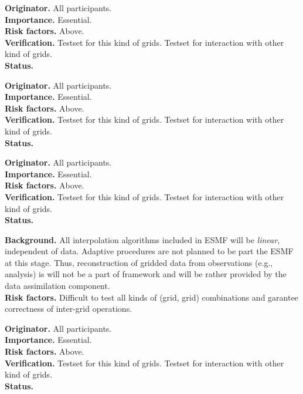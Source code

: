 \begin{reqlist}
{\bf Originator.} All participants. \\
{\bf Importance.} Essential. \\
{\bf Risk factors.} Above. \\
{\bf Verification.} Testset for this kind of grids. Testset for interaction 
with other kind of grids. \\
{\bf Status.} 
\end{reqlist}
\begin{reqlist}
{\bf Originator.} All participants. \\
{\bf Importance.} Essential. \\
{\bf Risk factors.} Above. \\
{\bf Verification.} Testset for this kind of grids. Testset for interaction 
with other kind of grids. \\
{\bf Status.} 
\end{reqlist} 
\begin{reqlist}
{\bf Originator.} All participants. \\
{\bf Importance.} Essential. \\
{\bf Risk factors.} Above. \\
{\bf Verification.} Testset for this kind of grids. Testset for interaction 
with other kind of grids. \\
{\bf Status.} 
\end{reqlist} 


\begin{reqlist}
{\bf Background.} All interpolation algorithms included in ESMF will be 
{\it linear}, independent of data. Adaptive procedures are not planned to be 
part the ESMF at this stage. Thus, reconstruction of gridded data from 
observations (e.g., analysis) is will not be a part of framework and will be 
rather provided by the data assimilation component.\\
{\bf Risk factors.} Difficult to test all kinds of (grid, grid) combinations 
and garantee correctness of inter-grid operations.
\end{reqlist}


\begin{reqlist}
{\bf Originator.} All participants. \\
{\bf Importance.} Essential. \\
{\bf Risk factors.} Above. \\
{\bf Verification.} Testset for this kind of grids. Testset for interaction 
with other kind of grids. \\
{\bf Status.} 
\end{reqlist}

